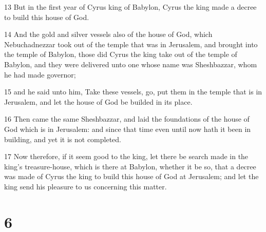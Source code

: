 \par 13 But in the first year of Cyrus king of Babylon, Cyrus the king made a decree to build this house of God.
\par 14 And the gold and silver vessels also of the house of God, which Nebuchadnezzar took out of the temple that was in Jerusalem, and brought into the temple of Babylon, those did Cyrus the king take out of the temple of Babylon, and they were delivered unto one whose name was Sheshbazzar, whom he had made governor;
\par 15 and he said unto him, Take these vessels, go, put them in the temple that is in Jerusalem, and let the house of God be builded in its place.
\par 16 Then came the same Sheshbazzar, and laid the foundations of the house of God which is in Jerusalem: and since that time even until now hath it been in building, and yet it is not completed.
\par 17 Now therefore, if it seem good to the king, let there be search made in the king's treasure-house, which is there at Babylon, whether it be so, that a decree was made of Cyrus the king to build this house of God at Jerusalem; and let the king send his pleasure to us concerning this matter.

\chapter{6}

